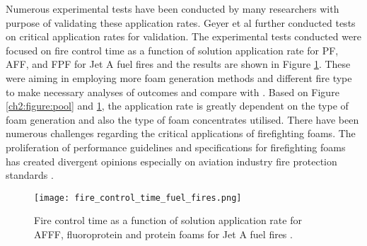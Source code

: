 Numerous experimental tests have been conducted by many researchers with purpose of validating these application rates. Geyer et al \cite{geyer1979comparative} further conducted tests on critical application rates for validation. The experimental tests conducted were focused on fire control time as a function of solution application rate for PF, AFF, and FPF for Jet A fuel fires and the results are shown in Figure \ref{ch2:figure:fuel}. These were aiming in employing more foam generation methods and different fire type to make necessary analyses of outcomes and compare with \cite{geyer1972evaluation}. Based on Figure \ref{ch2:figure:pool} and \ref{ch2:figure:fuel}, the application rate is greatly dependent on the type of foam generation and also the type of foam concentrates utilised. There have been numerous challenges regarding the critical applications of firefighting foams. The proliferation of performance guidelines and specifications for firefighting foams has created divergent opinions especially on aviation industry fire protection standards \cite{scheffey1995evaluating}.

\begin{figure}[H]
    \centering
    \texttt{[image: fire\_control\_time\_fuel\_fires.png]}
    \caption{Fire control time as a function of solution application rate for AFFF, fluoroprotein and protein foams for Jet A fuel fires \cite{geyer1972evaluation}.}
    \label{ch2:figure:fuel}
\end{figure}

